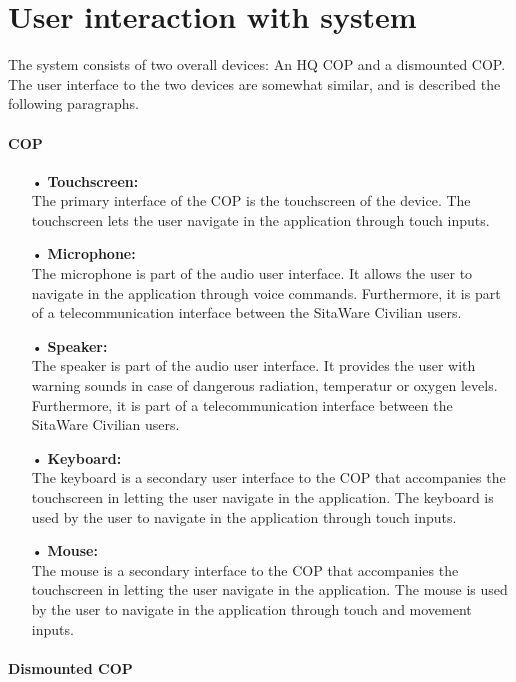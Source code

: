 \section{User interaction with system}

The system consists of two overall devices: An HQ COP and a dismounted COP. The user interface to the two devices are somewhat similar, and is described the following paragraphs. 

\paragraph{COP}
\begin{enumerate}
\item[•] \textbf{Touchscreen:} \\
The primary interface of the COP is the touchscreen of the device. The touchscreen lets the user navigate in the application through touch inputs. 

\item[•] \textbf{Microphone:} \\
The microphone is part of the audio user interface. It allows the user to navigate in the application through voice commands. Furthermore, it is part of a telecommunication interface between the SitaWare Civilian users. 

\item[•] \textbf{Speaker:} \\
The speaker is part of the audio user interface. It provides the user with warning sounds in case of dangerous radiation, temperatur or oxygen levels. Furthermore, it is part of a telecommunication interface between the SitaWare Civilian users.

\item[•] \textbf{Keyboard:}\\
The keyboard is a secondary user interface to the COP that accompanies the touchscreen in letting the user navigate in the application. The keyboard is used by the user to navigate in the application through touch inputs. 

\item[•] \textbf{Mouse:}\\
The mouse is a secondary interface to the COP that accompanies the touchscreen in letting the user navigate in the application. The mouse is used by the user to navigate in the application through touch and movement inputs. 
\end{enumerate}


\paragraph{Dismounted COP}

